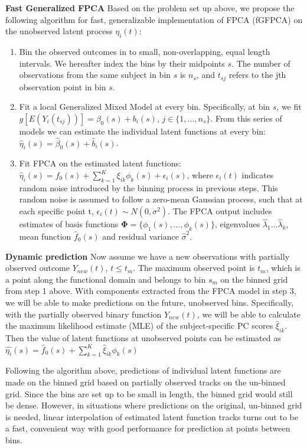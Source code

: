 \documentclass[
  11pt,
]{article}
\begin{document}
\textbf{Fast Generalized FPCA} Based on the problem set up above, we
propose the following algorithm for fast, generalizable implementation
of FPCA (fGFPCA) on the unobserved latent process \(\eta_i(t)\):

\begin{enumerate}
\def\labelenumi{\arabic{enumi}.}
\item
  Bin the observed outcomes in to small, non-overlapping, equal length
  intervals. We hereafter index the bins by their midpoints \(s\). The
  number of observations from the same subject in bin \(s\) is \(n_s\),
  and \(t_{sj}\) refers to the jth observation point in bin \(s\).
\item
  Fit a local Generalized Mixed Model at every bin. Specifically, at bin
  \(s\), we fit \(g[E(Y_i(t_{sj}))] = \beta_0(s)+b_i(s)\),
  \(j\in\{1, ..., n_s\}\). From this series of models we can estimate
  the individual latent functions at every bin:
  \(\hat{\eta}_i(s) = \hat{\beta}_0(s)+\hat{b}_i(s)\).
\item
  Fit FPCA on the estimated latent functions:
  \(\hat{\eta}_i(s) = f_0(s)+\sum_{k=1}^K\xi_{ik}\phi_{k}(s)+\epsilon_i(s)\),
  where \(\epsilon_i(t)\) indicates random noise introduced by the
  binning process in previous steps. This random noise is assumed to
  follow a zero-mean Gaussian process, such that at each specific point
  t, \(\epsilon_i(t) \sim N(0, \sigma^2)\). The FPCA output includes
  estimates of basis functions
  \(\boldsymbol{\Phi} = \{\phi_1(s), ...,\phi_k(s)\}\), eigenvalues
  \(\hat{\lambda}_1...\hat{\lambda}_k\), mean function \(\hat{f}_0(s)\)
  and residual variance \(\hat{\sigma}^2\).
\end{enumerate}

\textbf{Dynamic prediction} Now assume we have a new observations with
partially observed outcome \(Y_{new}(t)\), \(t\leq t_m\). The maximum
observed point is \(t_m\), which is a point along the functional domain
and belongs to bin \(s_m\) on the binned grid from step 1 above. With
components extracted from the FPCA model in step 3, we will be able to
make predictions on the future, unobserved bins. Specifically, with the
partially observed binary function \(Y_{new}(t)\), we will be able to
calculate the maximum likelihood estimate (MLE) of the subject-specific
PC scores \(\hat{\xi}_{ik}\). Then the value of latent functions at
unobserved points can be estimated as
\(\hat{\eta_i}(s)=\hat{f}_0(s)+\sum_{k=1}^K\hat{\xi}_{ik}{\phi}_k(s)\)

Following the algorithm above, predictions of individual latent
functions are made on the binned grid based on partially observed tracks
on the un-binned grid. Since the bins are set up to be small in length,
the binned grid would still be dense. However, in situations where
predictions on the original, un-binned grid is needed, linear
interpolation of estimated latent function tracks turns out to be a
fast, convenient way with good performance for prediction at points
between bins.
\end{document}
